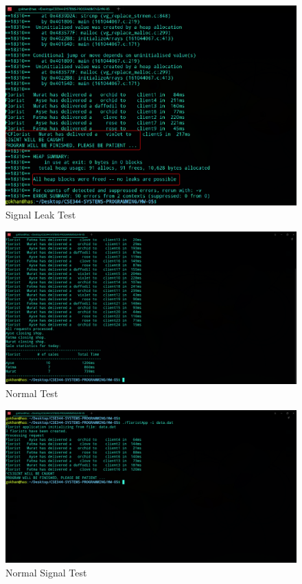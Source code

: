 \documentclass{article}
\begin{document}
\begin{figure}[h!]
\centering
\includegraphics[scale=0.4]{signalleaktest.png}
\caption{Signal Leak Test}
\label{fig:compile}
\end{figure}

\begin{figure}[h!]
\centering
\includegraphics[scale=0.25]{normal.png}
\caption{Normal Test}
\label{fig:compile}
\end{figure}

\begin{figure}[h!]
\centering
\includegraphics[scale=0.25]{normalsignal.png}
\caption{Normal Signal Test}
\label{fig:compile}
\end{figure}


\end{document}
